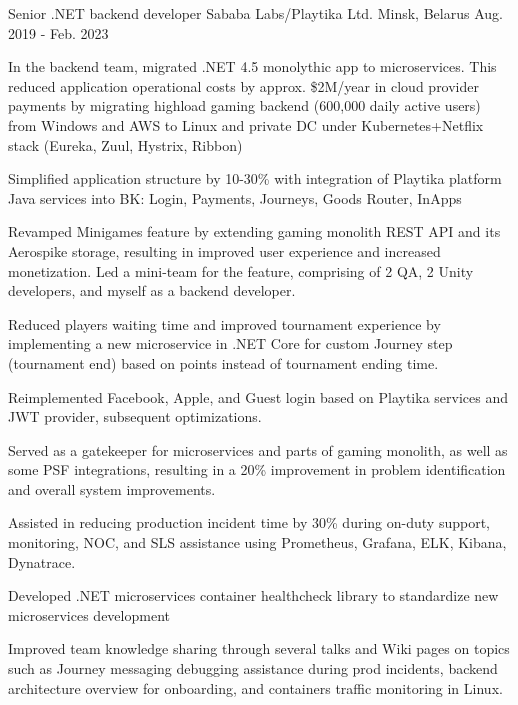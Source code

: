 \begin{cventries}
  \cventry
    {Senior .NET backend developer} %
    {Sababa Labs/Playtika Ltd.} %
    {Minsk, Belarus} %
    {Aug. 2019 - Feb. 2023} %
    {
      \begin{cvitems} %
        \item {In the backend team, migrated .NET 4.5 monolythic app to microservices. This reduced application operational costs by approx. \$2M/year in cloud provider payments by migrating highload gaming backend (600,000 daily active users) from Windows and AWS to Linux and private DC under Kubernetes+Netflix stack (Eureka, Zuul, Hystrix, Ribbon)}
        \item {Simplified application structure by 10-30\% with integration of Playtika platform Java services into BK: Login, Payments, Journeys, Goods Router, InApps}
        \item {Revamped Minigames feature by extending gaming monolith REST API and its Aerospike storage, resulting in improved user experience and increased monetization. Led a mini-team for the feature, comprising of 2 QA, 2 Unity developers, and myself as a backend developer.}
        \item {Reduced players waiting time and improved tournament experience by implementing a new microservice in .NET Core for custom Journey step (tournament end) based on points instead of tournament ending time.}
        \item {Reimplemented Facebook, Apple, and Guest login based on Playtika services and JWT provider, subsequent optimizations.}
        \item {Served as a gatekeeper for microservices and parts of gaming monolith, as well as some PSF integrations, resulting in a 20\% improvement in problem identification and overall system improvements.}
        \item {Assisted in reducing production incident time by 30\% during on-duty support, monitoring, NOC, and SLS assistance using Prometheus, Grafana, ELK, Kibana, Dynatrace.}
        \item {Developed .NET microservices container healthcheck library to standardize new microservices development}
        \item {Improved team knowledge sharing through several talks and Wiki pages on topics such as Journey messaging debugging assistance during prod incidents, backend architecture overview for onboarding, and containers traffic monitoring in Linux.}
      \end{cvitems}
    }


\end{cventries}
